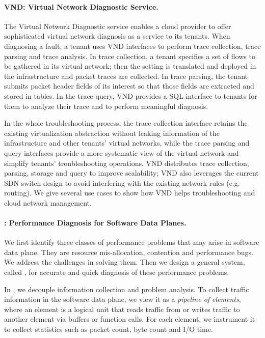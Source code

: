 \paragraph{VND: Virtual Network Diagnostic Service.} The
Virtual Network Diagnostic service enables a
cloud provider to offer sophisticated virtual network diagnosis as a
service to its tenants. When diagnosing a fault, a tenant 
uses VND interfaces to perform trace collection, trace parsing and trace 
analysis. 
In trace collection, a tenant specifies a set of flows to be gathered in its virtual network;
then the setting is translated and deployed in the infrastructure and packet traces are collected.
In trace parsing, the tenant submits packet header fields of its interest so that 
those fields are extracted and stored in tables. 
In the trace query, VND provides a SQL interface to tenants for them to analyze their trace
and to perform meaningful diagnosis. 

In the whole troubleshooting process, the trace collection interface 
retains the existing virtualization abstraction without
leaking information of the infrastructure and other tenants' virtual networks, 
while the trace parsing and query interfaces provide a more systematic view of the virtual network
and  simplify tenants' troubleshooting operations.
VND distributes trace collection, parsing, storage and query to improve scalability; 
VND also leverages the current SDN switch design to avoid interfering with the existing network rules 
(e.g. routing).
We give several use cases to show how VND helps troubleshooting and cloud network management.
\paragraph{\Name: Performance Diagnosis for Software Data Planes.}
We first identify three classes of performance problems that may arise in software data plane.
They are resource mis-allocation, contention and performance bugs. 
We address the challenges in solving them.
Then we design a general system, called \Name, for accurate and quick
diagnosis of these performance problems. 

In \Name, we decouple information collection and problem analysis.
To collect traffic information in the software data plane, we view it as
a \emph{pipeline of elements}, where an element is a logical unit that 
reads traffic from or writes traffic to another element via buffers or function calls.
For each element, we instrument it to collect statistics such as 
packet count, byte count and I/O time. 

